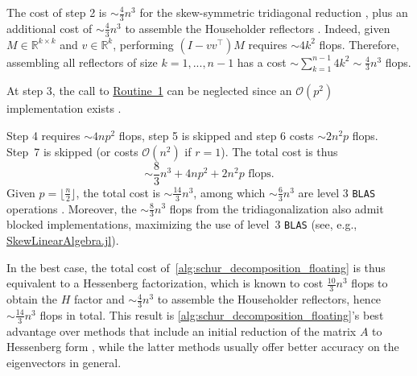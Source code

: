 \documentclass[10pt,twoside,dvipsnames]{siamart1116}
\numberwithin{algorithm}{section}
\numberwithin{equation}{section}
\newcommand{\wordref}[2]{\hyperlink{#1}{#2}}
\begin{document}
	The cost of step 2 is $\sim	\frac{4}{3}n^3$ for the skew-symmetric tridiagonal reduction \cite[Lec.~26]{trefethen97}, plus an additional cost of $\sim \frac{4}{3}n^3$ to assemble the Householder reflectors \cite[Sec.~5.1.6]{GoluVanl96}. Indeed, given $M\in\mathbb{R}^{k\times k}$ and $v\in\mathbb{R}^k$, performing $(I-vv^\top )M$ requires $\sim 4k^2$ flops. Therefore, assembling all reflectors of size $k=1,...,n-1$ has a cost $\sim\sum_{k=1}^{n-1}4k^2\sim\frac{4}{3}n^3$ flops. 
	
	At step 3, the call to \wordref{oracle1}{Routine~1} can be neglected since an $\mathcal{O}(p^2)$ implementation exists \cite{GROER200345}. 
	
	Step 4 requires $\sim 4np^2$ flops, step 5 is skipped and step 6 costs $\sim 2n^2p$ flops. Step~7 is skipped (or costs $\mathcal{O}(n^2)$ if $r=1$). The total cost is thus
	\begin{equation}\label{eq:best_cost}
	\sim\frac{8}{3}n^3 + 4np^2  + 2n^2p \text{ flops}.
\end{equation}
Given $p=\lfloor\frac{n}{2}\rfloor$, the total cost is $\sim \frac{14}{3}n^3$, among which $\sim\frac{6}{3}n^3$ are level 3 \texttt{BLAS} operations \cite{blackford2002updated}. Moreover, the $\sim\frac{8}{3}n^3$ flops from the tridiagonalization also admit blocked implementations, maximizing the use of level~3 \texttt{BLAS} (see, e.g., \href{https://github.com/JuliaLinearAlgebra/SkewLinearAlgebra.jl}{SkewLinearAlgebra.jl}).
	
	In the best case, the total cost of~\cref{alg:schur_decomposition_floating} is thus equivalent to a Hessenberg factorization, which is known to cost $\frac{10}{3}n^3$ flops to obtain the $H$ factor \cite[Lec.~26]{trefethen97} and $\sim \frac{4}{3}n^3$ to assemble the Householder reflectors, hence $\sim \frac{14}{3}n^3$ flops in total. This result is \cref{alg:schur_decomposition_floating}'s best advantage over methods that include an initial reduction of the matrix $A$ to Hessenberg form \cite{AmmarReichel86,graggreichel90,wanggragg02,wanggragg01}, while the latter methods usually offer better accuracy on the eigenvectors in general.
	
	
\end{document}
